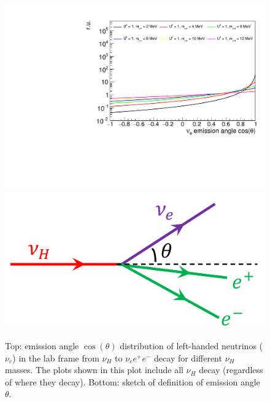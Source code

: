 \documentclass[%
 reprint,
 amsmath,amssymb,
 aps,
 prd,
twocolumn,
]{revtex4-1}
\begin{document}
\begin{figure}[!ht]
\includegraphics[width=0.99\columnwidth]{../plots/nuLEmissionAngle_U1.0_AllMass_linXlogY.pdf}\\
\includegraphics[width=0.7\columnwidth]{figs/emission_angle_sketch.png}
\caption{Top: emission angle $\cos(\theta)$ distribution of left-handed neutrinos ($\nu_e$) in the lab frame from $\nu_H$ to $\nu_e e^+ e^-$ decay for different $\nu_H$ masses. The plots shown in this plot include all $\nu_H$ decay (regardless of where they decay). Bottom: sketch of definition of emission angle $\theta$.}
\label{fig:nuLEmissionAngle_all_decay} 
\end{figure}
\end{document}
